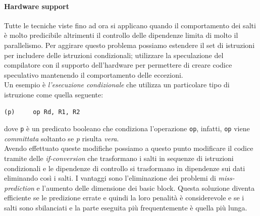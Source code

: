\paragraph{Hardware support}
Tutte le tecniche viste fino ad ora si applicano quando il comportamento dei salti è molto predicibile altrimenti il controllo delle dipendenze limita di molto il parallelismo. Per aggirare questo problema possiamo estendere il set di istruzioni per includere delle istruzioni condizionali; utilizzare la speculazione del compilatore con il supporto dell'hardware per permettere di creare codice speculativo mantenendo il comportamento delle eccezioni.\\
Un esempio è \emph{l'esecuzione condizionale} che utilizza un particolare tipo di istruzione come quella seguente:
\begin{verbatim}
(p)     op Rd, R1, R2
\end{verbatim}
dove \texttt{p} è un predicato booleano che condiziona l'operazione \texttt{op}, infatti, \texttt{op} viene \emph{committata} soltanto se \emph{p} risulta \emph{vera}.\\
Avendo effettuato queste modifiche possiamo a questo punto modificare il codice tramite delle \emph{if-conversion} che trasformano i salti in sequenze di istruzioni condizionali e le dipendenze di controllo si trasformano in dipendenze sui dati eliminando così i salti. I vantaggi sono l'eliminazione dei problemi di \emph{miss-prediction} e l'aumento delle dimensione dei basic block. Questa soluzione diventa efficiente se le predizione errate e quindi la loro penalità è considerevole e se i salti sono sbilanciati e la parte eseguita più frequentemente è quella più lunga.
